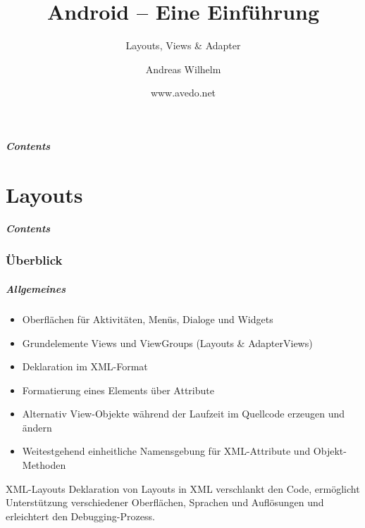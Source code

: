 \title{Android -- Eine Einführung}
\subtitle{Layouts, Views \& Adapter}
\author[A. Wilhelm]{Andreas Wilhelm}
\titlegraphic{}
\date{www.avedo.net}

\begin{frame}[plain]
  \titlepage
\end{frame}

\section[Contents]{}
\begin{frame}
	\frametitle{Contents}
	\tableofcontents[onlyparts]
\end{frame}

\part{Layouts}
\frame{\partpage}
\begin{frame}
	\frametitle{Contents}
	\tableofcontents[]
\end{frame}

\section{Überblick}
\begin{frame}
   \frametitle{Allgemeines}
   \begin{itemize}
      \item Oberflächen für Aktivitäten, Menüs, Dialoge und Widgets
      \item Grundelemente Views und ViewGroups (Layouts \& AdapterViews)
      \item Deklaration im XML-Format
      \item Formatierung eines Elements über Attribute
      \item Alternativ View-Objekte während der Laufzeit im Quellcode 
         erzeugen und ändern
      \item Weitestgehend einheitliche Namensgebung für XML-Attribute 
         und Objekt-Methoden
   \end{itemize}

   \begin{alertblock}{XML-Layouts}
      Deklaration von Layouts in XML verschlankt den Code, 
      ermöglicht Unterstützung verschiedener Oberflächen, Sprachen 
      und Auflösungen und erleichtert den Debugging-Prozess.
   \end{alertblock}
\end{frame}

